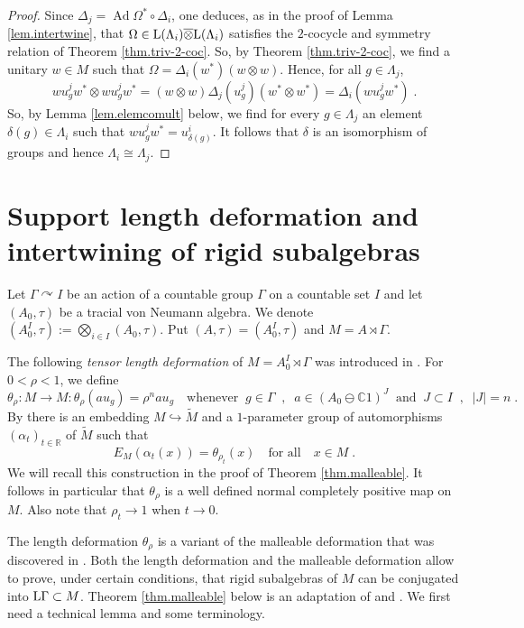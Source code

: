 \documentclass[a4paper,11pt]{amsart}
\numberwithin{equation}{section}
\begin{document}
\begin{proof}
Since ${\Delta}_j = {\operatorname{Ad}} \Omega^* \circ {\Delta}_i$, one deduces, as in the proof of Lemma \ref{lem.intertwine}, that $\Omega \in {\mathord{\text{\rm L}}}(\Lambda_i) {\mathbin{\overline{\otimes}}} {\mathord{\text{\rm L}}}(\Lambda_i)$ satisfies the $2$-cocycle and symmetry relation of Theorem \ref{thm.triv-2-coc}. So, by Theorem \ref{thm.triv-2-coc}, we find a unitary $w \in M$ such that $\Omega = {\Delta}_i(w^*)(w {\otimes} w)$. Hence, for all $g \in \Lambda_j$,
$$wu^j_gw^*  {\otimes} wu^j_g w^* = (w {\otimes} w){\Delta}_j(u^j_g)(w^* {\otimes} w^*) = {\Delta}_i(w u^j_g w^*) \; .$$
So, by Lemma \ref{lem.elemcomult} below, we find for every $g \in \Lambda_j$ an element $\delta(g) \in \Lambda_i$ such that $w u^j_g w^* = u^i_{\delta(g)}$. It follows that $\delta$ is an isomorphism of groups and hence $\Lambda_i \cong \Lambda_j$.
\end{proof}

\section{Support length deformation and intertwining of rigid subalgebras}\label{sec.tensorlength}

Let $\Gamma {\curvearrowright} I$ be an action of a countable group $\Gamma$ on a countable set $I$ and let $(A_0,\tau)$ be a tracial von Neumann algebra. We denote $(A_0^I,\tau) := \bigotimes_{i \in I} (A_0,\tau)$. Put $(A,\tau) = (A_0^I,\tau)$ and $M = A \rtimes \Gamma$.

The following \emph{tensor length deformation} of $M = A_0^I \rtimes \Gamma$ was introduced in \cite{Io06}. For $0 < \rho < 1$, we define
$$\theta_\rho : M {\rightarrow} M : \theta_\rho(a u_g) = \rho^n a u_g \quad\text{whenever}\;\; g \in \Gamma \;\;,\;\; a \in (A_0 \ominus {\mathbb{C}}1)^J \;\;\text{and}\;\; J \subset I \;\;,\;\; |J|=n \; .$$
By \cite[Section 2]{Io06} there is an embedding $M \hookrightarrow {\widetilde{M}}$ and a $1$-parameter group of automorphisms $({\alpha}_t)_{t \in {\mathbb{R}}}$ of ${\widetilde{M}}$ such that
\begin{equation}\label{eq.dilation}
E_M({\alpha}_t(x)) = \theta_{\rho_t}(x) \quad\text{for all}\quad x \in M \; .
\end{equation}
We will recall this construction in the proof of Theorem \ref{thm.malleable}. It follows in particular that $\theta_\rho$ is a well defined normal completely positive map on $M$. Also note that $\rho_t {\rightarrow} 1$ when $t {\rightarrow} 0$.

The length deformation $\theta_\rho$ is a variant of the malleable deformation that was discovered in \cite{Po03}. Both the length deformation and the malleable deformation allow to prove, under certain conditions, that rigid subalgebras of $M$ can be conjugated into ${\mathord{\text{\rm L}}} \Gamma \subset M$. Theorem \ref{thm.malleable} below is an adaptation of \cite[Theorem 4.1]{Po03} and \cite[Theorem 2.1]{Io10}. We first need a technical lemma and some terminology.
\end{document}
